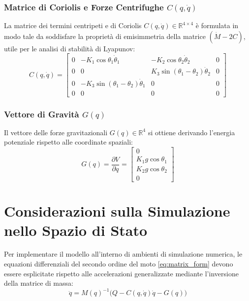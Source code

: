 \documentclass[11pt,a4paper]{article}
\begin{document}
	\subsubsection{Matrice di Coriolis e Forze Centrifughe $C(q, \dot{q})$}
	La matrice dei termini centripeti e di Coriolis $C(q, \dot{q}) \in \mathbb{R}^{4 \times 4}$ è formulata in modo tale da soddisfare la proprietà di emisimmetria della matrice $(\dot{M} - 2C)$, utile per le analisi di stabilità di Lyapunov:
	\begin{equation}
		C(q, \dot{q}) = \begin{bmatrix}
			0 & -K_1\cos\theta_1 \dot{\theta}_1 & -K_2\cos\theta_2 \dot{\theta}_2 & 0 \\
			0 & 0 & K_3\sin(\theta_1-\theta_2)\dot{\theta}_2 & 0 \\
			0 & -K_3\sin(\theta_1-\theta_2)\dot{\theta}_1 & 0 & 0 \\
			0 & 0 & 0 & 0
		\end{bmatrix}
	\end{equation}
	
	\subsubsection{Vettore di Gravità $G(q)$}
	Il vettore delle forze gravitazionali $G(q) \in \mathbb{R}^4$ si ottiene derivando l'energia potenziale rispetto alle coordinate spaziali:
	\begin{equation}
		G(q) = \frac{\partial V}{\partial q} = \begin{bmatrix}
			0 \\
			K_1 g \cos\theta_1 \\
			K_2 g \cos\theta_2 \\
			0
		\end{bmatrix}
	\end{equation}
	
	\section{Considerazioni sulla Simulazione nello Spazio di Stato}
	Per implementare il modello all'interno di ambienti di simulazione numerica, le equazioni differenziali del secondo ordine del moto \eqref{eq:matrix_form} devono essere esplicitate rispetto alle accelerazioni generalizzate mediante l'inversione della matrice di massa:
	\begin{equation}
		\ddot{q} = M(q)^{-1} \Big( Q - C(q, \dot{q})\dot{q} - G(q) \Big)
	\end{equation}
	
\end{document}
